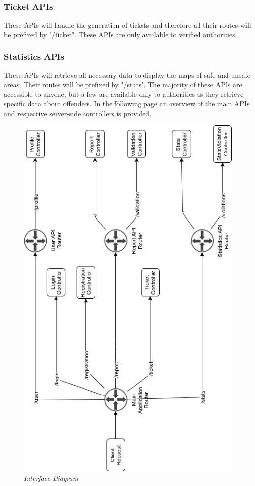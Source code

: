 \subsubsection{Ticket APIs}
These APIs will handle the generation of tickets and therefore all their routes will be prefixed by "/ticket". These APIs are only available to verified authorities.

\subsubsection{Statistics APIs}
These APIs will retrieve all necessary data to display the maps of safe and unsafe areas. Their routes will be prefixed by "/stats". The majority of these APIs are accessible to anyone, but a few are available only to authorities as they retrieve specific data about offenders.
\newline
\newline
In the following page an overview of the main APIs and respective server-side controllers is provided.
\newpage
\begin{figure}[H]
  \centering
  \includegraphics[origin=c,width=\textwidth,height=.95\textheight,keepaspectratio]{DD_Images/ComponentInterface/InterfaceDiagram.jpg}
  \caption{\textit{Interface Diagram}}
\end{figure}